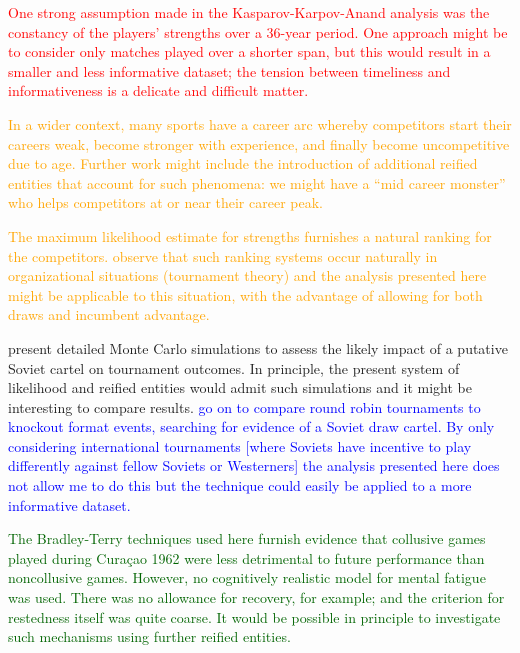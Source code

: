 \documentclass[review]{elsarticle}
\begin{document}
\textcolor{red}{One strong assumption made in the
  Kasparov-Karpov-Anand analysis was the constancy of the players'
  strengths over a 36-year period.  One approach might be to consider
  only matches played over a shorter span, but this would result in a
  smaller and less informative dataset; the tension between timeliness
  and informativeness is a delicate and difficult matter.}

\textcolor{orange}{In a wider context, many sports have a career arc
  whereby competitors start their careers weak, become stronger with
  experience, and finally become uncompetitive due to age.  Further
  work might include the introduction of additional reified entities
  that account for such phenomena: we might have a ``mid career
  monster'' who helps competitors at or near their career peak.}

\textcolor{orange}{The maximum likelihood estimate for strengths
  furnishes a natural ranking for the competitors.  \cite{lazear1981}
  observe that such ranking systems occur naturally in organizational
  situations (tournament theory) and the analysis presented here might
  be applicable to this situation, with the advantage of allowing for
  both draws and incumbent advantage.}
 
\cite{moul2009} present detailed Monte Carlo simulations to assess the
likely impact of a putative Soviet cartel on tournament outcomes.  In
principle, the present system of likelihood and reified entities would
admit such simulations and it might be interesting to compare results.
\textcolor{blue}{\cite{moul2009} go on to compare round robin
  tournaments to knockout format events, searching for evidence of a
  Soviet draw cartel.  By only considering international tournaments
  [where Soviets have incentive to play differently against fellow
    Soviets or Westerners] the analysis presented here does not allow
  me to do this but the technique could easily be applied to a more
  informative dataset.}

\textcolor{DarkGreen}{The Bradley-Terry techniques used here furnish
  evidence that collusive games played during Cura\c{c}ao 1962 were
  less detrimental to future performance than noncollusive games.
  However, no cognitively realistic model for mental
  fatigue~\citep{boksem2008,linden2003} was used.  There was no
  allowance for recovery, for example; and the criterion for
  restedness itself was quite coarse.  It would be possible in
  principle to investigate such mechanisms using further reified
  entities.}
\end{document}
